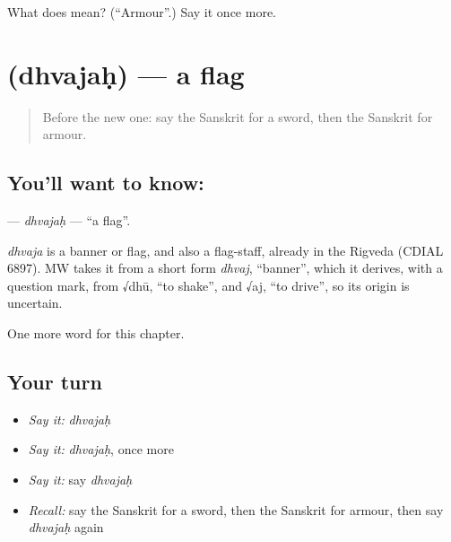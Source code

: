 \begin{tcolorbox}[breakable,colback=teal!4,colframe=teal!35!black,title={Before you move on}]
What does  mean? (\textquotedblleft{}Armour\textquotedblright{}.) Say it once more.
\end{tcolorbox}
\section[\texorpdfstring{\sk{ध्वजः} (dhvajaḥ)}{ध्वजः (dhvajaḥ)}]{ (dhvajaḥ) — a flag}

\label{lesson:SA-C247-dhvajah}



\begin{quote}
Before the new one: say the Sanskrit for a sword, then the Sanskrit for armour.
\end{quote}

\subsection*{You'll want to know: }
\textbf{} — \emph{dhvajaḥ} — \textquotedblleft{}a flag\textquotedblright{}.

\begin{cousinweb}
\emph{dhvaja} is a banner or flag, and also a flag-staff, already in the Rigveda (CDIAL 6897). MW takes it from a short form \emph{dhvaj}, \textquotedblleft{}banner\textquotedblright{}, which it derives, with a question mark, from √dhū, \textquotedblleft{}to shake\textquotedblright{}, and √aj, \textquotedblleft{}to drive\textquotedblright{}, so its origin is uncertain.
\end{cousinweb}

\begin{grammarlens}[title={What you've built}]
One more word for this chapter.
\end{grammarlens}

\subsection*{Your turn}
\begin{itemize}
\raggedright
  \item \emph{Say it:} \emph{dhvajaḥ}
  \item \emph{Say it:} \emph{dhvajaḥ}, once more
  \item \emph{Say it:} say \emph{dhvajaḥ}
  \item \emph{Recall:} say the Sanskrit for a sword, then the Sanskrit for armour, then say \emph{dhvajaḥ} again
\end{itemize}

